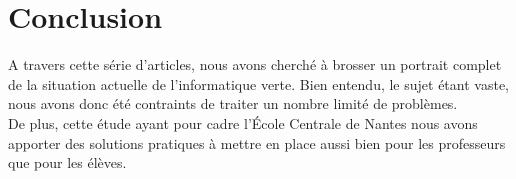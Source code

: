 \documentclass[a4paper,11pt,french]{article}
\begin{document}
\section{Conclusion}

A travers cette série d'articles, nous avons cherché à brosser un portrait complet de la situation actuelle de l'informatique verte. Bien entendu, le sujet étant vaste, nous avons donc été contraints de traiter un nombre limité de problèmes.\\
De plus, cette étude ayant pour cadre l'\'Ecole Centrale de Nantes nous avons apporter des solutions pratiques à mettre en place aussi bien pour les professeurs que pour les élèves.
\end{document}

